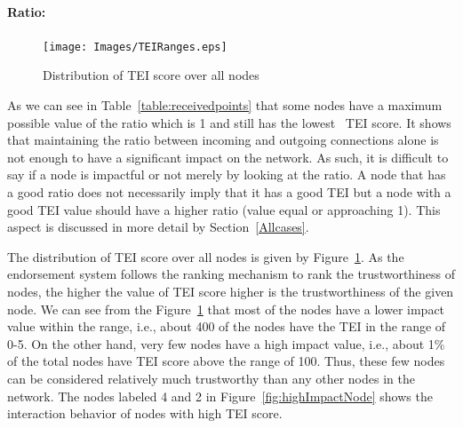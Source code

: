 \paragraph{Ratio:} \label{par:ratio}
\begin{figure}[H]
	\texttt{[image: Images/TEIRanges.eps]}
	\caption{Distribution of \ac{TEI} score over all nodes}
	\label{table:totalimpact}
\end{figure}
As we can see in Table~\ref{table:receivedpoints} that some nodes have a
maximum possible value of the ratio which is 1 and still has the lowest
~\ac{TEI} score. It shows that maintaining the ratio between incoming and
outgoing connections alone is not enough to have a significant impact on the
network. As such, it is difficult to say if a node is impactful or not merely
by looking at the ratio. A node that has a good ratio does not necessarily
imply that it has a good \ac{TEI} but a node with a good \ac{TEI} value should
have a higher ratio (value equal or approaching 1). This aspect is discussed in
more detail by Section~\ref{Allcases}. \par
The distribution of \ac{TEI} score over all nodes is given by
Figure~\ref{table:totalimpact}. As the endorsement system follows the ranking
mechanism to rank the trustworthiness of nodes, the higher the value of
\ac{TEI} score higher is the trustworthiness of the given node. We can see from
the Figure~\ref{table:totalimpact} that most of the nodes have a lower impact
value within the range, i.e., about 400 of the nodes have the \ac{TEI} in the
range of 0-5. On the other hand, very few nodes have a high impact value, i.e.,
about 1\% of the total nodes have \ac{TEI} score above the range of 100. Thus,
these few nodes can be considered relatively much trustworthy than any other
nodes in the network. The nodes labeled 4 and 2 in
Figure~\ref{fig:highImpactNode} shows the interaction behavior of nodes with
high \ac{TEI} score. 
